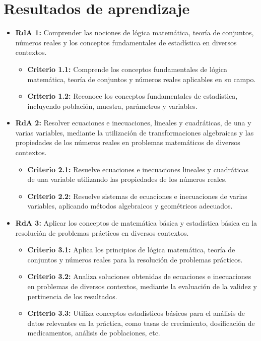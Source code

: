 \documentclass[a4,11pt]{aleph-notas}
\begin{document}
\addtolength{\headheight}{1.8\baselineskip}
\addtolength{\voffset}{-1.5\baselineskip}

\encabezado

\section{Resultados de aprendizaje} 

\begin{itemize}[leftmargin=*]
\item 
    \textbf{RdA 1:} Comprender las nociones de lógica matemática, teoría de conjuntos, números reales y los conceptos fundamentales de estadística en diversos contextos.
    \begin{itemize}[leftmargin=*]
        \item \textbf{Criterio 1.1:} Comprende los conceptos fundamentales de lógica matemática, teoría de conjuntos y números reales aplicables en su campo.
        \item \textbf{Criterio 1.2:} Reconoce los conceptos fundamentales de estadística, incluyendo población, muestra, parámetros y variables.
    \end{itemize}
\item 
    \textbf{RdA 2:} Resolver ecuaciones e inecuaciones, lineales y cuadráticas, de una y varias variables, mediante la utilización de transformaciones algebraicas y las propiedades de los números reales en problemas matemáticos de diversos contextos.
    \begin{itemize}[leftmargin=*]
        \item \textbf{Criterio 2.1:} Resuelve ecuaciones e inecuaciones lineales y cuadráticas de una variable utilizando las propiedades de los números reales.
        \item \textbf{Criterio 2.2:} Resuelve sistemas de ecuaciones e inecuaciones de varias variables, aplicando métodos algebraicos y geométricos adecuados.
    \end{itemize}
\item
    \textbf{RdA 3:} Aplicar los conceptos de matemática básica y estadística básica en la resolución de problemas prácticos en diversos contextos.
    \begin{itemize}[leftmargin=*]
        \item \textbf{Criterio 3.1:} Aplica los principios de lógica matemática, teoría de conjuntos y números reales para la resolución de problemas prácticos.
        \item \textbf{Criterio 3.2:} Analiza soluciones obtenidas de ecuaciones e inecuaciones en problemas de diversos contextos, mediante la evaluación de la validez y pertinencia de los resultados.
        \item \textbf{Criterio 3.3:} Utiliza conceptos estadísticos básicos para el análisis de datos relevantes en la práctica, como tasas de crecimiento, dosificación de medicamentos, análisis de poblaciones, etc.
    \end{itemize}
\end{itemize}
\end{document}
